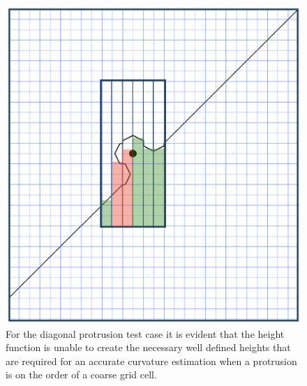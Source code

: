 \begin{figure}[htbp]
	\centering
\includegraphics[width=0.5\linewidth]{figs/probhts.png}
	\caption{For the diagonal protrusion test case it is evident that the height function is unable to create the necessary well defined heights that are required for an accurate curvature estimation when a protrusion is on the order of a coarse grid cell.}
	\label{fig:probhts2}
\end{figure}








